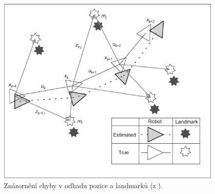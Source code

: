 \documentclass[12pt]{report}
\begin{document}
\begin{figure}[!ht]
	\begin{center}
		\includegraphics[width=0.6\columnwidth]{imgs/SLAM_estimate_vs_reality.pdf}
	\end{center}
	\caption{Znázornění chyby v odhadu pozice a landmarků (z \cite{Durrant-Whyte2006}).}
	\label{fig:SLAM_estimate_vs_reality}
\end{figure}
\end{document}
